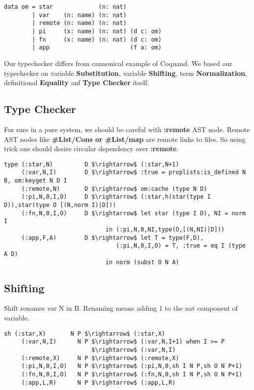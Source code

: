 \documentclass{article}
\begin{document}
\begin{lstlisting}[mathescape=true]
data om = star             (n: nat)
        | var    (n: name) (n: nat)
        | remote (n: name) (n: nat)
        | pi     (x: name) (n: nat) (d c: om)
        | fn     (x: name) (n: nat) (d c: om)
        | app                       (f a: om)
\end{lstlisting}

Our typechecker differs from cannonical example of Coquand\cite{Coq96}. 
We based our typechecker on variable {\bf Substitution}, variable {\bf Shifting}, term {\bf Normalization}, definitional {\bf Equality} anf {\bf Type Checker} itself.

\subsection{Type Checker}
For sure in a pure system, we should be careful with {\bf :remote} AST node.
Remote AST nodes like {\bf \#List/Cons or \#List/map} are remote links to files.
So using trick one should desire circular dependency over {\bf :remote}.

\begin{lstlisting}[mathescape=true]
type (:star,N)         D $\rightarrow$ (:star,N+1)
     (:var,N,I)        D $\rightarrow$ :true = proplists:is_defined N B, om:keyget N D I
     (:remote,N)       D $\rightarrow$ om:cache (type N D)
     (:pi,N,0,I,O)     D $\rightarrow$ (:star,h(star(type I D)),star(type O [(N,norm I)|D]))
     (:fn,N,0,I,O)     D $\rightarrow$ let star (type I D), NI = norm I
                             in (:pi,N,0,NI,type(O,[(N,NI)|D]))
     (:app,F,A)        D $\rightarrow$ let T = type(F,D),
                                (:pi,N,0,I,O) = T, :true = eq I (type A D)
                             in norm (subst O N A)
\end{lstlisting}

\newpage
\subsection{Shifting}
Shift renames var N in B. Renaming means adding 1 to the nat component of variable.

\begin{lstlisting}[mathescape=true]
  sh (:star,X)       N P $\rightarrow$ (:star,X)
     (:var,N,I)      N P $\rightarrow$ (:var,N,I+1) when I >= P
                         $\rightarrow$ (:var,N,I)
     (:remote,X)     N P $\rightarrow$ (:remote,X)
     (:pi,N,0,I,O)   N P $\rightarrow$ (:pi,N,0,sh I N P,sh O N P+1)
     (:fn,N,0,I,O)   N P $\rightarrow$ (:fn,N,0,sh I N P,sh O N P+1)
     (:app,L,R)      N P $\rightarrow$ (:app,L,R)
\end{lstlisting}
\end{document}
